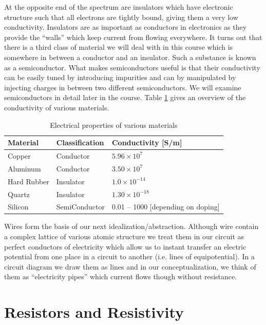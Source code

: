 \documentclass{tufte-book}
\begin{document}
At the opposite end of the spectrum are insulators which have electronic structure such that all electrons are tightly bound, giving them a very low conductivity. Insulators are as important as conductors in electronics as they provide the ``walls'' which keep current from flowing everywhere. It turns out that there is a third class of material we will deal with in this course which is somewhere in between a conductor and an insulator. Such a substance is known as a semiconductor. What makes semiconductors useful is that their conductivity can be easily tuned by introducing impurities and can by manipulated by injecting charges in between two different semiconductors. We will examine semiconductors in detail later in the course. Table \ref{tab:conduct} gives an overview of the conductivity of various materials.

\begin{table}[]
\centering
\caption{Electrical properties of various materials}
\label{tab:conduct}
\begin{tabular}{lll}
\hline
Material    & Classification & Conductivity {[}S/m{]} \\ \hline\hline
Copper      & Conductor      &          $5.96\times10^7$             \\
Aluminum        & Conductor      &             $3.50\times10^7$           \\
Hard Rubber        & Insulator      &             $1.0\times10^{-14}$      \\
Quartz        & Insulator      &             $1.30\times10^{-18}$           \\
 Silicon & SemiConductor      &          0.01 -- 1000 [depending on doping]            \\ \hline
\end{tabular}
\end{table}

Wires form the basis of our next idealization/abstraction. Although wire contain a complex lattice of various atomic structure we treat them in our circuit as perfect conductors of electricity which allow us to instant transfer an electric potential from one place in a circuit to another (i.e. lines of equipotential). In a circuit diagram we draw them as lines and in our conceptualization, we think of them as ``electricity pipes'' which current flows though without resistance. 


\section{Resistors and Resistivity}
\end{document}
